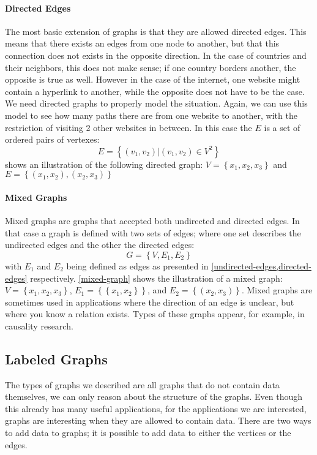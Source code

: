 \paragraph{Directed Edges} The most basic extension of graphs is that they are allowed directed edges. This means that there exists an edges from one node to another, but that this connection does not exists in the opposite direction. In the case of countries and their neighbors, this does not make sense; if one country borders another, the opposite is true as well. However in the case of the internet, one website might contain a hyperlink to another, while the opposite does not have to be the case. We need directed graphs to properly model the situation. Again, we can use this model to see how many paths there are from one website to another, with the restriction of visiting 2 other websites in between. In this case the $E$ is a set of ordered pairs of vertexes:
\begin{equation}
	E = \left\{\left(v_1, v_2\right) | \left(v_1, v_2\right) \in V^2\right\}
	\label{directed-edges}
\end{equation}
 shows an illustration of the following directed graph:
$V = \left\{x_1, x_2, x_3\right\}$ and $E = \left\{\left(x_1, x_2\right), \left(x_2, x_3\right)\right\}$

\paragraph{Mixed Graphs}
Mixed graphs are graphs that accepted both undirected and directed edges. In that case a graph is defined with two sets of edges; where one set describes the undirected edges and the other the directed edges:
\begin{equation}
	G = \left\{V, E_1, E_2\right\}
\end{equation}
with $E_1$ and $E_2$ being defined as edges as presented in \cref{undirected-edges,directed-edges} respectively. \cref{mixed-graph} shows the illustration of a mixed graph:
$V = \left\{x_1, x_2, x_3\right\}$, $E_1 = \left\{\left\{x_1, x_2\right\}\right\}$, and $E_2 = \left\{\left(x_2, x_3\right)\right\}$.
Mixed graphs are sometimes used in applications where the direction of an edge is unclear, but where you know a relation exists. Types of these graphs appear, for example, in causality research. 

\subsection{Labeled Graphs}
The types of graphs we described are all graphs that do not contain data themselves, we can only reason about the structure of the graphs. Even though this already has many useful applications, for the applications we are interested, graphs are interesting when they are allowed to contain data. There are two ways to add data to graphs; it is possible to add data to either the vertices or the edges.

